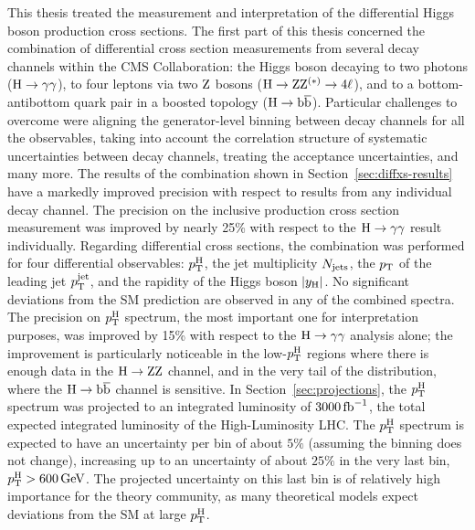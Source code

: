 This thesis treated the measurement and interpretation of the differential Higgs boson production cross sections.
% 
The first part of this thesis concerned the combination of differential cross section measurements from several decay channels within the CMS Collaboration: the Higgs boson decaying to two photons ($\mathrm{H}\to\mathrm{\gamma}\mathrm{\gamma}$), to four leptons via two $\mathrm{Z}$ bosons ($\mathrm{H}\to\mathrm{Z}\mathrm{Z}^{(\ast)}\to 4\ell$), and to a bottom-antibottom quark pair in a boosted topology ($\mathrm{H}\to\mathrm{b}\overline{\mathrm{b}}$).
% 
Particular challenges to overcome were aligning the generator-level binning between decay channels for all the observables, taking into account the correlation structure of systematic uncertainties between decay channels, treating the acceptance uncertainties, and many more.
% 
The results of the combination shown in Section~\ref{sec:diffxs-results} have a markedly improved precision with respect to results from any individual decay channel.
% 
The precision on the inclusive production cross section measurement was improved by nearly 25\% with respect to the $\mathrm{H}\to\mathrm{\gamma}\mathrm{\gamma}$ result individually.
% 
Regarding differential cross sections, the combination was performed for four differential observables: $p_\mathrm{T}^\mathrm{H}$, the jet multiplicity $N_\text{jets} $, the $p_\mathrm{T}$ of the leading jet $p_\mathrm{T}^\text{jet} $, and the rapidity of the Higgs boson $\left|y_\mathrm{H}\right| $.
% 
No significant deviations from the SM prediction are observed in any of the combined spectra.
% 
The precision on $p_\mathrm{T}^\mathrm{H}$ spectrum, the most important one for interpretation purposes, was improved by 15\% with respect to the $\mathrm{H}\to\mathrm{\gamma}\mathrm{\gamma}$ analysis alone; the improvement is particularly noticeable in the low-$p_\mathrm{T}^\mathrm{H}$ regions where there is enough data in the $\mathrm{H}\to\mathrm{Z}\mathrm{Z}$ channel, and in the very tail of the distribution, where the $\mathrm{H}\to\mathrm{b}\overline{\mathrm{b}}$ channel is sensitive.
% 
In Section~\ref{sec:projections}, the $p_\mathrm{T}^\mathrm{H}$ spectrum was projected to an integrated luminosity of $3000\,\text{fb}^{-1}$, the total expected integrated luminosity of the High-Luminosity LHC.
% 
The $p_\mathrm{T}^\mathrm{H}$ spectrum is expected to have an uncertainty per bin of about $5\%$ (assuming the binning does not change), increasing up to an uncertainty of about $25\%$ in the very last bin, $p_\mathrm{T}^\mathrm{H} > 600\,\text{GeV}$.
% 
The projected uncertainty on this last bin is of relatively high importance for the theory community, as many theoretical models expect deviations from the SM at large $p_\mathrm{T}^\mathrm{H}$.


